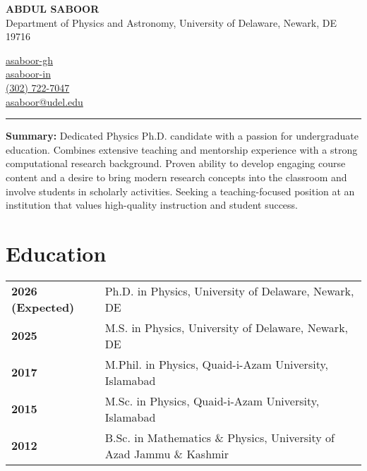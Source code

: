 \documentclass[letter,11pt]{article}
\begin{document}
\begin{minipage}{0.65\textwidth}
    \raggedright
    {\Large \textbf{ABDUL SABOOR}} \\ 
    Department of Physics and Astronomy, University of Delaware, Newark, DE 19716 
\end{minipage}
\hfill
\begin{minipage}{0.3\textwidth}
    \raggedright
    \faGithub \quad \href{https://github.com/asaboor-gh}{asaboor-gh}\\
    \faLinkedin \quad \href{https://linkedin.com/in/asaboor-in}{asaboor-in} \\
    \faPhone \quad \href{tel:+13027227047}{(302) 722-7047} \\
    \faEnvelope \quad \href{mailto:asaboor@udel.edu}{asaboor@udel.edu}
\end{minipage}
\vspace{2mm}
\hrule
\vspace{4mm} 

\noindent
\textbf{Summary:} Dedicated Physics Ph.D. candidate with a passion for undergraduate education. Combines extensive teaching and mentorship experience with a strong computational research background. Proven ability to develop engaging course content and a desire to bring modern research concepts into the classroom and involve students in scholarly activities. Seeking a teaching-focused position at an institution that values high-quality instruction and student success.

\section{Education}
\begin{tabular}{p{3.25cm} p{12cm}}
    \textbf{2026 (Expected)} & Ph.D. in Physics, University of Delaware, Newark, DE \\
    \textbf{2025} & M.S. in Physics, University of Delaware, Newark, DE \\
    \textbf{2017} & M.Phil. in Physics, Quaid-i-Azam University, Islamabad \\
    \textbf{2015} & M.Sc. in Physics, Quaid-i-Azam University, Islamabad \\
    \textbf{2012} & B.Sc. in Mathematics \& Physics, University of Azad Jammu \& Kashmir \\
\end{tabular}
\end{document}
